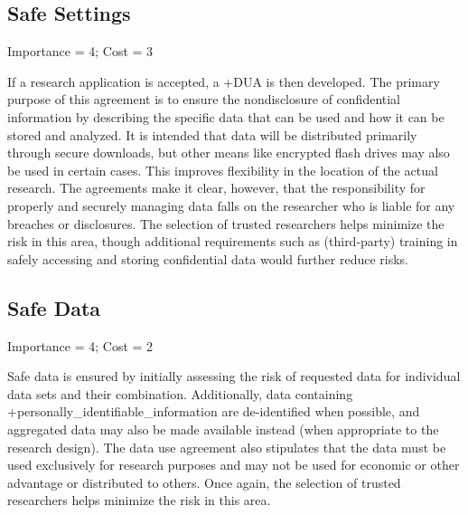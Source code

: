 \documentclass[
]{book}
\begin{document}
\hypertarget{safe-settings-6}{%
\subsection{Safe Settings}\label{safe-settings-6}}

Importance = 4; Cost = 3

If a research application is accepted, a +DUA\textbar{} is then developed. The primary purpose of this agreement is to ensure the nondisclosure of confidential information by describing the specific data that can be used and how it can be stored and analyzed. It is intended that data will be distributed primarily through secure downloads, but other means like encrypted flash drives may also be used in certain cases. This improves flexibility in the location of the actual research. The agreements make it clear, however, that the responsibility for properly and securely managing data falls on the researcher who is liable for any breaches or disclosures. The selection of trusted researchers helps minimize the risk in this area, though additional requirements such as (third-party) training in safely accessing and storing confidential data would further reduce risks.

\hypertarget{safe-data-6}{%
\subsection{Safe Data}\label{safe-data-6}}

Importance = 4; Cost = 2

Safe data is ensured by initially assessing the risk of requested data for individual data sets and their combination. Additionally, data containing +personally\_identifiable\_information\textbar{} are de-identified when possible, and aggregated data may also be made available instead (when appropriate to the research design). The data use agreement also stipulates that the data must be used exclusively for research purposes and may not be used for economic or other advantage or distributed to others. Once again, the selection of trusted researchers helps minimize the risk in this area.
\end{document}
